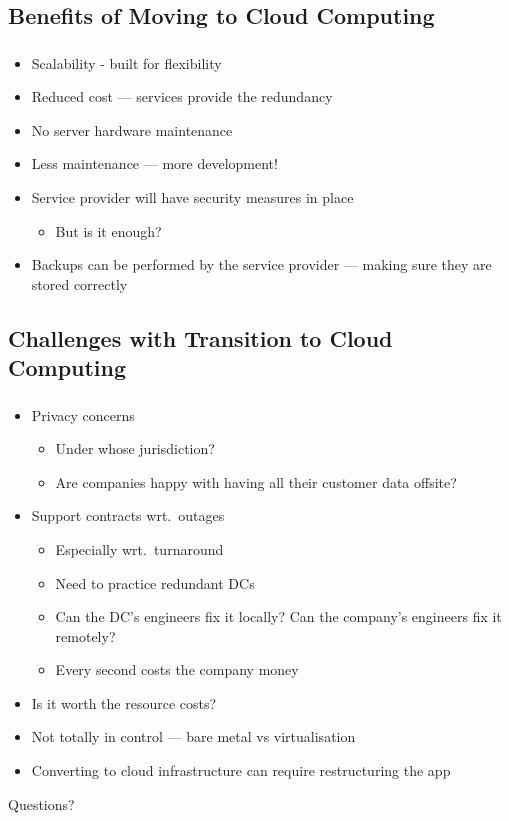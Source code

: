 \documentclass[10pt]{beamer}
\makeatletter
\newcommand*{\currentname}{\@currentlabelname}
\makeatother
\begin{document}
\subsection{Benefits of Moving to Cloud Computing}
\begin{frame}
	\frametitle{\currentname}

	\begin{itemize}
		\item Scalability - built for flexibility
		\item Reduced cost --- services provide the redundancy
		\item No server hardware maintenance
		\item Less maintenance --- more development!
		\item Service provider will have security measures in place
			\begin{itemize}
				\item But is it enough?
			\end{itemize}
		\item Backups can be performed by the service provider --- making sure they are stored correctly
	\end{itemize}

\end{frame}


\subsection{Challenges with Transition to Cloud Computing}
\begin{frame}
	\frametitle{\currentname}

	\begin{itemize}
		\item Privacy concerns
			\begin{itemize}
				\item Under whose jurisdiction?
				\item Are companies happy with having all their customer data offsite?
			\end{itemize}
		\item Support contracts wrt.\ outages
			\begin{itemize}
				\item Especially wrt.\ turnaround
				\item Need to practice redundant DCs
				\item Can the DC's engineers fix it locally? Can the company's engineers fix it remotely?
				\item Every second costs the company money
			\end{itemize}
		\item Is it worth the resource costs?
		\item Not totally in control --- bare metal vs virtualisation
		\item Converting to cloud infrastructure can require restructuring the app
	\end{itemize}
\end{frame}


\begin{frame}[plain]{}
	Questions?
\end{frame}
\end{document}
